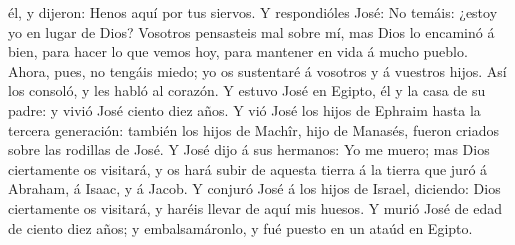 él, y dijeron: Henos aquí por tus siervos.  Y respondióles
José: No temáis: ¿estoy yo en lugar de Dios?  Vosotros
pensasteis mal sobre mí, mas Dios lo encaminó á bien, para hacer lo que
vemos hoy, para mantener en vida á mucho pueblo.  Ahora,
pues, no tengáis miedo; yo os sustentaré á vosotros y á vuestros hijos.
Así los consoló, y les habló al corazón.  Y estuvo José en
Egipto, él y la casa de su padre: y vivió José ciento diez años.
 Y vió José los hijos de Ephraim hasta la tercera
generación: también los hijos de Machîr, hijo de Manasés, fueron criados
sobre las rodillas de José.  Y José dijo á sus hermanos: Yo
me muero; mas Dios ciertamente os visitará, y os hará subir de aquesta
tierra á la tierra que juró á Abraham, á Isaac, y á Jacob. 
Y conjuró José á los hijos de Israel, diciendo: Dios ciertamente os
visitará, y haréis llevar de aquí mis huesos.  Y murió José
de edad de ciento diez años; y embalsamáronlo, y fué puesto en un ataúd
en Egipto.
